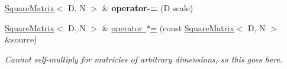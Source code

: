 \begin{Indent}
\begin{DoxyCompactItemize}
\mbox{\hyperlink{classrev_1_1_square_matrix}{Square\+Matrix}}$<$ D, N $>$ \& {\bfseries operator-\/=} (D scale)
\item 
\mbox{\label{classrev_1_1_square_matrix_af3a21bd8e1fc8cb8277e7634417dac33}} 
\mbox{\hyperlink{classrev_1_1_square_matrix}{Square\+Matrix}}$<$ D, N $>$ \& \mbox{\hyperlink{classrev_1_1_square_matrix_af3a21bd8e1fc8cb8277e7634417dac33}{operator $\ast$=}} (const \mbox{\hyperlink{classrev_1_1_square_matrix}{Square\+Matrix}}$<$ D, N $>$ \&source)
\begin{DoxyCompactList}\small\item\em Cannot self-\/multiply for matricies of arbitrary dimensions, so this goes here. \end{DoxyCompactList}\end{DoxyCompactItemize}
\end{Indent}

